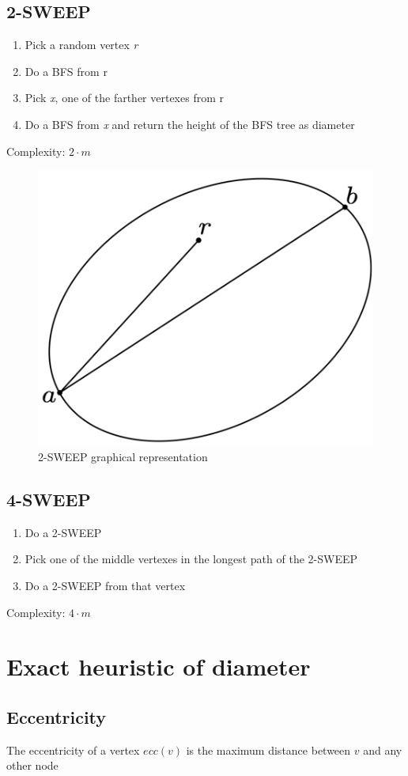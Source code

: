 \subsection{2-SWEEP}
\begin{enumerate}
	\item Pick a random vertex \textit{r}
	\item Do a BFS from r
	\item Pick \textit{x}, one of the farther vertexes from r
	\item Do a BFS from \textit{x} and return the height of the BFS tree as diameter
\end{enumerate}
Complexity: $ 2 \cdot m $

\begin{figure}[H]
	\includegraphics[width=0.4\linewidth]{img/2sweep}
	\caption{2-SWEEP graphical representation}
	\label{fig:2sweep}
\end{figure}
\subsection{4-SWEEP}
\begin{enumerate}
	\item Do a 2-SWEEP
	\item Pick one of the middle vertexes in the longest path of the 2-SWEEP
	\item Do a 2-SWEEP from that vertex
\end{enumerate}
Complexity: $ 4 \cdot m $
\section{Exact heuristic of diameter}
\subsection{Eccentricity}
The eccentricity of a vertex $ ecc(v) $ is the maximum distance between $ v $ and any other node
\subsection{}